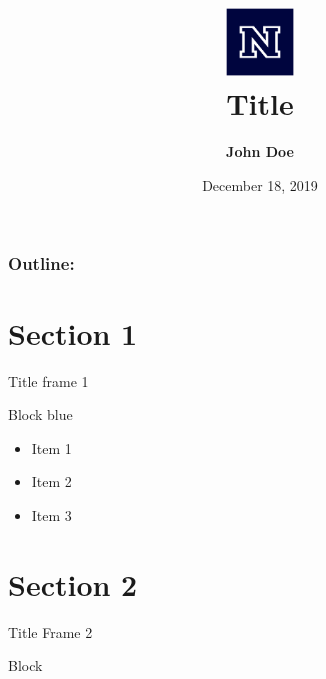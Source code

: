 \documentclass[xcolor=dvipsnames]{beamer}
\title[Title]{\includegraphics[height=1.8cm]{images/nevada-blockn-blue.eps}\\Title}
\author[John Doe]{ \textbf{John Doe}}
\institute[UNR]{University of Nevada, Reno}
\date{December 18, 2019}
\begin{document}
{
\begin{frame}
\vspace{6em}
  \titlepage
\end{frame}
}
\begin{frame}
\frametitle{\textbf{Outline:}}
\tableofcontents
\end{frame}

		
  
    \section{Section 1}  
     \begin{frame}{Title frame 1}
            \begin{block}{Block blue}
    		\begin{itemize}
    		\item Item 1
    		\item Item 2
    		\item Item 3
  			\end{itemize}
        \end{block}  
     \end{frame}
          
   \section{Section 2}  
     \begin{frame}{Title Frame 2}
        \begin{block}{Block}
            \lipsum[2]
        \end{block}
     \end{frame}
     
\end{document}
